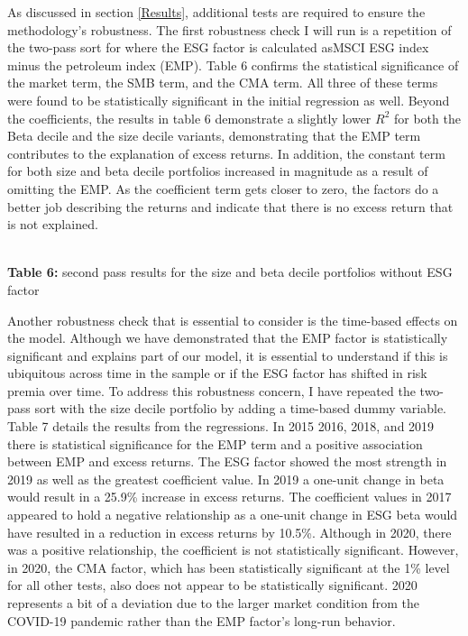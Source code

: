 As discussed in section \ref{Results}, additional tests are required to ensure the methodology's robustness. The first robustness check I will run is a repetition of the two-pass sort for where the ESG factor is calculated asMSCI ESG index minus the petroleum index (EMP). Table 6 confirms the statistical significance of the market term, the SMB term, and the CMA term. All three of these terms were found to be statistically significant in the initial regression as well. Beyond the coefficients,  the results in table 6 demonstrate a slightly lower $R^2$ for both the Beta decile and the size decile variants, demonstrating that the EMP term contributes to the explanation of excess returns. In addition, the constant term for both size and beta decile portfolios increased in magnitude as a result of omitting the EMP. As the coefficient term gets closer to zero, the factors do a better job describing the returns and indicate that there is no excess return that is not explained. 
 
 \begin{center}
    \paperspacingnarrow
    \\
    \textbf{Table 6:} second pass results for the size and beta decile portfolios without ESG factor\\
    \paperspacingwide
\end{center}
Another robustness check that is essential to consider is the time-based effects on the model. Although we have demonstrated that the EMP factor is statistically significant and explains part of our model, it is essential to understand if this is ubiquitous across time in the sample or if the  ESG factor has shifted in risk premia over time. To address this robustness concern, I have repeated the two-pass sort with the size decile portfolio by adding a time-based dummy variable. Table 7 details the results from the regressions. In 2015 2016, 2018, and 2019 there is statistical significance for the EMP term and a positive association between EMP and excess returns. The ESG factor showed the most strength in 2019 as well as the greatest coefficient value. In 2019 a one-unit change in beta would result in a 25.9\% increase in excess returns. The coefficient values in 2017 appeared to hold a negative relationship as a one-unit change in ESG beta would have resulted in a reduction in excess returns by 10.5\%. Although in 2020, there was a positive relationship, the coefficient is not statistically significant. However, in 2020, the CMA factor, which has been statistically significant at the 1\% level for all other tests, also does not appear to be statistically significant. 2020 represents a bit of a deviation due to the larger market condition from the COVID-19 pandemic rather than the EMP factor's long-run behavior.


